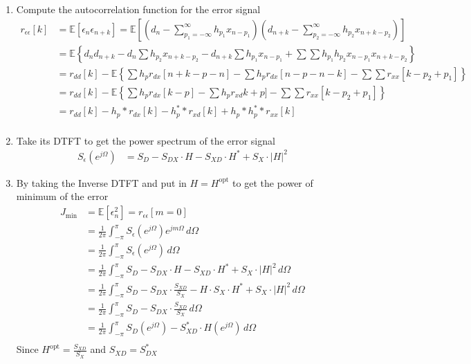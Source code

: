 \documentclass[12pt]{article}
\newcommand{\intpipi}{\int_{-\pi}^{\pi}}
\newcommand{\mexp}{\mathbb{E}}
\newcommand{\des}{d_n}
\newcommand{\err}{\epsilon_n}
\newcommand{\opt}{\textrm{opt}}
\begin{document}
\begin{enumerate}
    \item Compute the autocorrelation function for the error signal
    \begin{align*}
        r_{\epsilon\epsilon}[k] &= \mexp[\epsilon_n \epsilon_{n+k}] = \mexp\left[(\des - \sum_{p_1=-\infty}^{\infty} h_{p_1} x_{n-p_1}) (d_{n+k} - \sum_{p_2=-\infty}^{\infty} h_{p_2} x_{n+k-p_2}) \right] \\
        & = \mexp\left\{ d_n d_{n+k} - d_n\sum h_{p_2}x_{n+k-p_2} - d_{n+k}\sum h_{p_1}x_{n-p_1} + \sum\sum h_{p_1}h_{p_2}x_{n-p_1}x_{n+k-p_2}         \right\} \\
        & = r_{dd}[k] - \mexp\left\{\sum h_p r_{dx}[n+k-p-n] - \sum h_p r_{dx}[n-p-n-k] - \sum\sum r_{xx}[k-p_2 + p_1]\right\} \\
        & = r_{dd}[k] - \mexp\left\{\sum h_p r_{dx}[k-p] - \sum h_p r_{xd}k+p] - \sum\sum r_{xx}[k-p_2 + p_1]\right\} \\
        & = r_{dd}[k] - h_p * r_{dx}[k] - h_p^* * r_{xd}[k] + h_p * h_p^* * r_{xx}[k] \\
    \end{align*}
    \item Take its DTFT to get the power spectrum of the error signal
    \begin{align*}
        S_{\epsilon}(e^{j\Omega}) &= S_D - S_{DX} \cdot H - S_{XD} \cdot H^* + S_X \cdot |H|^2
    \end{align*}
    \item By taking the Inverse DTFT and put in $H = H^{\opt}$ to get the power of minimum of the error
    \begin{align*}
        J_{\min} &= \mexp[\err^2] = r_{{\epsilon\epsilon} }[m=0] \\
        & = \frac{1}{2\pi}\intpipi S_{\epsilon}(e^{j\Omega})e^{jm\Omega}\, d\Omega \\
        & = \frac{1}{2\pi}\intpipi S_{\epsilon}(e^{j\Omega})\, d\Omega \\
        & = \frac{1}{2\pi}\intpipi S_D - S_{DX} \cdot H - S_{XD} \cdot H^* + S_X \cdot |H|^2\, d\Omega \\
        & = \frac{1}{2\pi}\intpipi S_D - S_{DX} \cdot \frac{S_{XD}}{S_X} - H \cdot S_X \cdot H^* + S_X \cdot |H|^2\, d\Omega \\
        & = \frac{1}{2\pi}\intpipi S_D - S_{DX} \cdot \frac{S_{XD}}{S_X}\, d\Omega \\
        & = \frac{1}{2\pi}\intpipi S_D(e^{j\Omega}) - S_{XD}^* \cdot H(e^{j\Omega})\, d\Omega \\
    \end{align*}
    Since $H^{\opt} = \frac{S_{XD}}{S_X}$ and $S_{XD} = S_{DX}^*$
\end{enumerate}
\end{document}
